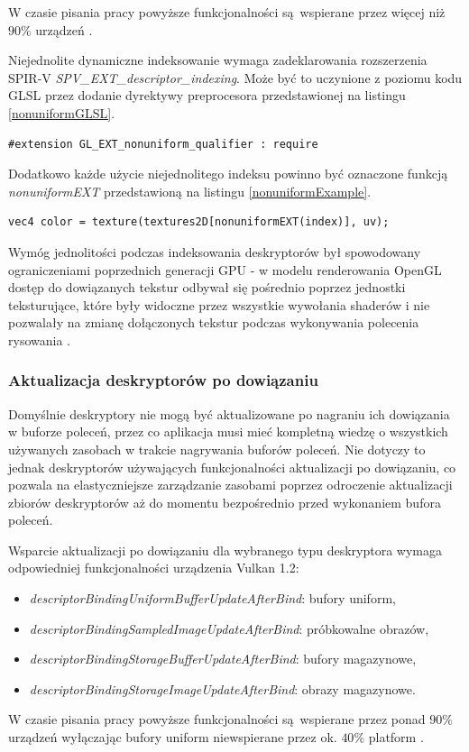 W czasie pisania pracy powyższe funkcjonalności są wspierane przez więcej niż $90\%$ urządzeń \cite{GPUINFO}.

Niejednolite dynamiczne indeksowanie wymaga zadeklarowania rozszerzenia SPIR-V \textit{SPV\_EXT\_descriptor\_indexing}.
Może być to uczynione z poziomu kodu GLSL przez dodanie dyrektywy preprocesora przedstawionej na listingu \ref{nonuniformGLSL}.
\lstset{language=GLSL}
\begin{lstlisting}[caption={Dyrektywa preprocesora dla niejednolitych indeksów},captionpos=b,label={nonuniformGLSL}]
#extension GL_EXT_nonuniform_qualifier : require
\end{lstlisting}
Dodatkowo każde użycie niejednolitego indeksu powinno być oznaczone funkcją \textit{nonuniformEXT} przedstawioną na listingu \ref{nonuniformExample}.
\lstset{language=GLSL}
\begin{lstlisting}[caption={Próbkowanei używając niejednolitego indeksu},captionpos=b,label={nonuniformExample}]
vec4 color = texture(textures2D[nonuniformEXT(index)], uv);
\end{lstlisting}

Wymóg jednolitości podczas indeksowania deskryptorów był spowodowany ograniczeniami poprzednich generacji GPU - w modelu renderowania OpenGL dostęp do dowiązanych tekstur odbywał się pośrednio poprzez jednostki teksturujące, które były widoczne przez wszystkie wywołania shaderów i nie pozwalały na zmianę dołączonych tekstur podczas wykonywania polecenia rysowania \cite{GPUGEM4}. 

\subsubsection {Aktualizacja deskryptorów po dowiązaniu}

Domyślnie deskryptory nie mogą być aktualizowane po nagraniu ich dowiązania w buforze poleceń, przez co aplikacja musi mieć kompletną wiedzę o wszystkich używanych zasobach w trakcie nagrywania buforów poleceń.
Nie dotyczy to jednak deskryptorów używających funkcjonalności aktualizacji po dowiązaniu, co pozwala na elastyczniejsze zarządzanie zasobami poprzez odroczenie aktualizacji zbiorów deskryptorów aż do momentu bezpośrednio przed wykonaniem bufora poleceń.

Wsparcie aktualizacji po dowiązaniu dla wybranego typu deskryptora wymaga odpowiedniej funkcjonalności urządzenia Vulkan 1.2:
\begin{itemize}
	\item {\textit{descriptorBindingUniformBufferUpdateAfterBind}}: bufory uniform,
	\item {\textit{descriptorBindingSampledImageUpdateAfterBind}}: próbkowalne obrazów,
	\item {\textit{descriptorBindingStorageBufferUpdateAfterBind}}: bufory magazynowe,
	\item {\textit{descriptorBindingStorageImageUpdateAfterBind}}: obrazy magazynowe.
\end{itemize}
W czasie pisania pracy powyższe funkcjonalności są wspierane przez ponad $90\%$ urządzeń wyłączając bufory uniform niewspierane przez ok. $40\%$ platform \cite{GPUINFO}.

